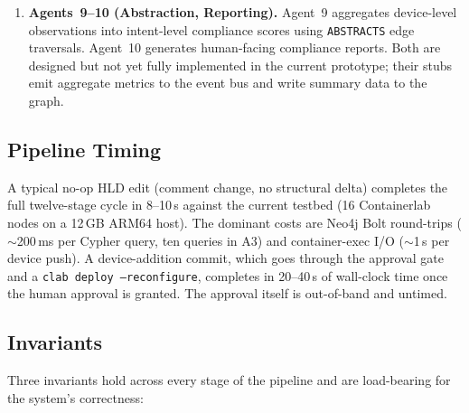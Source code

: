 \documentclass[acmtog]{acmart}
\renewcommand\_{\textunderscore\allowbreak}
\begin{document}
\begin{enumerate}[label=\textbf{Stage~\arabic*.},leftmargin=3em]
    Auto-remediation re-invokes A3$\rightarrow$A5 on the narrowed
    artefact set for the affected devices. Rollback walks the
    \texttt{PRECEDED\_BY} chain one step to retrieve the previous
    \texttt{Configuration} node and re-pushes it. Every action is
    recorded as a \texttt{Remediation} node at L6 with fields:
    \texttt{remediationId}, \texttt{intentId}, \texttt{action},
    \texttt{success}, \texttt{error}, \texttt{escalated},
    \texttt{rollbackCount}.

  \item \textbf{Agents~9--10 (Abstraction, Reporting).}
    Agent~9 aggregates device-level observations into intent-level
    compliance scores using \texttt{ABSTRACTS} edge traversals.
    Agent~10 generates human-facing compliance reports. Both are
    designed but not yet fully implemented in the current prototype;
    their stubs emit aggregate metrics to the event bus and write
    summary data to the graph.
\end{enumerate}

\subsection{Pipeline Timing}

A typical no-op HLD edit (comment change, no structural delta)
completes the full twelve-stage cycle in 8--10\,s against the current
testbed (16 Containerlab nodes on a 12\,GB ARM64 host). The
dominant costs are Neo4j Bolt round-trips ($\sim$200\,ms per Cypher
query, ten queries in A3) and container-exec I/O ($\sim$1\,s per
device push). A device-addition commit, which goes through the
approval gate and a \texttt{clab deploy --reconfigure}, completes
in 20--40\,s of wall-clock time once the human approval is granted.
The approval itself is out-of-band and untimed.


\subsection{Invariants}\label{sec:cl:invariants}

Three invariants hold across every stage of the pipeline and are
load-bearing for the system's correctness:
\end{document}
